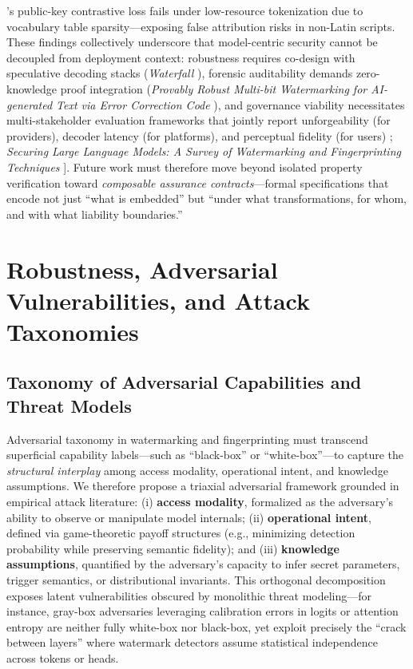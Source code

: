 \documentclass[11pt,a4paper]{article}
\begin{document}
\cite{doi:10.3390/electronics14010025}'s public-key contrastive loss fails under low-resource tokenization due to vocabulary table sparsity---exposing false attribution risks in non-Latin scripts. These findings collectively underscore that model-centric security cannot be decoupled from deployment context: robustness requires co-design with speculative decoding stacks (\emph{Waterfall} \cite{doi:10.3390/electronics14010025}), forensic auditability demands zero-knowledge proof integration (\emph{Provably Robust Multi-bit Watermarking for AI-generated Text via Error Correction Code} \cite{doi:10.3390/electronics14010025}), and governance viability necessitates multi-stakeholder evaluation frameworks that jointly report unforgeability (for providers), decoder latency (for platforms), and perceptual fidelity (for users) \cite{doi:10.1145/3691626}; \emph{Securing Large Language Models: A Survey of Watermarking and Fingerprinting Techniques} \cite{doi:10.3390/electronics14010025}]. Future work must therefore move beyond isolated property verification toward \emph{composable assurance contracts}---formal specifications that encode not just ``what is embedded'' but ``under what transformations, for whom, and with what liability boundaries.''


\section{Robustness, Adversarial Vulnerabilities, and Attack Taxonomies}



\subsection{Taxonomy of Adversarial Capabilities and Threat Models}


Adversarial taxonomy in watermarking and fingerprinting must transcend superficial capability labels---such as ``black-box'' or ``white-box''---to capture the \emph{structural interplay} among access modality, operational intent, and knowledge assumptions. We therefore propose a triaxial adversarial framework grounded in empirical attack literature: (i) \textbf{access modality}, formalized as the adversary's ability to observe or manipulate model internals; (ii) \textbf{operational intent}, defined via game-theoretic payoff structures (e.g., minimizing detection probability while preserving semantic fidelity); and (iii) \textbf{knowledge assumptions}, quantified by the adversary's capacity to infer secret parameters, trigger semantics, or distributional invariants. This orthogonal decomposition exposes latent vulnerabilities obscured by monolithic threat modeling---for instance, gray-box adversaries leveraging calibration errors in logits or attention entropy are neither fully white-box nor black-box, yet exploit precisely the ``crack between layers'' where watermark detectors assume statistical independence across tokens or heads.
\end{document}

